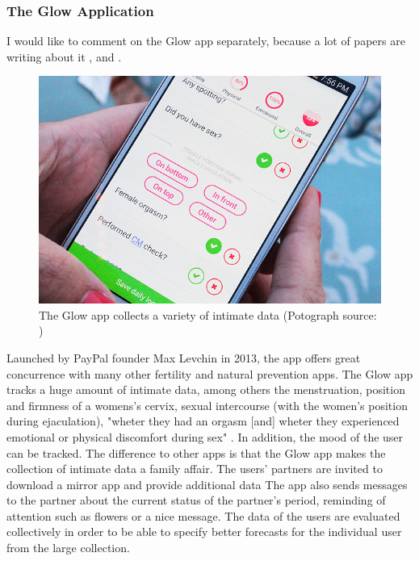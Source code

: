 \subsubsection{The Glow Application}
I would like to comment on the Glow app separately, because a lot of papers are writing about it \cite{doi:10.1080/15265161.2017.1409823}, \cite{levy2014intimate} and \cite{doi:10.1080/13691058.2014.920528}.
\begin{figure}[htb]
	\centering
	\includegraphics[width=\linewidth]{img/Glow-App-review-screenshot-1.jpg}
	\caption{The Glow app collects a variety of intimate data (Potograph source: \cite{glowApp})}
	\label{fig:glow_app}
\end{figure}
Launched by PayPal founder Max Levchin in 2013, the app offers great concurrence with many other fertility and natural prevention apps. The Glow app tracks a huge amount of intimate data, among others the menstruation, position and firmness of a womens's cervix, sexual intercourse (with the women's position during ejaculation), "wheter they had an orgasm [and] wheter they experienced emotional or physical discomfort during sex" \cite{doi:10.1080/13691058.2014.920528}. In addition, the mood of the user can be tracked.
The difference to other apps is that the Glow app makes the collection of intimate data a family affair. The users' partners are invited to download a mirror app and provide additional data \cite{levy2014intimate} The app also sends messages to the partner about the current status of the partner's period, reminding of attention such as flowers or a nice message.
The data of the users are evaluated collectively in order to be able to specify better forecasts for the individual user from the large collection.

